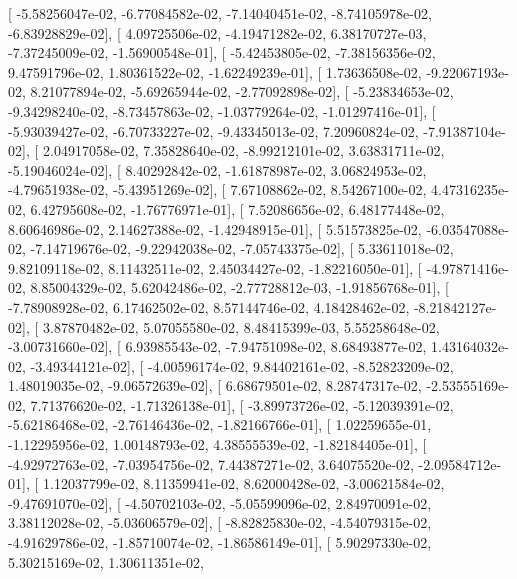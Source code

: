 \documentclass{article}
\begin{document}
       [ -5.58256047e-02,  -6.77084582e-02,  -7.14040451e-02,
         -8.74105978e-02,  -6.83928829e-02],
       [  4.09725506e-02,  -4.19471282e-02,   6.38170727e-03,
         -7.37245009e-02,  -1.56900548e-01],
       [ -5.42453805e-02,  -7.38156356e-02,   9.47591796e-02,
          1.80361522e-02,  -1.62249239e-01],
       [  1.73636508e-02,  -9.22067193e-02,   8.21077894e-02,
         -5.69265944e-02,  -2.77092898e-02],
       [ -5.23834653e-02,  -9.34298240e-02,  -8.73457863e-02,
         -1.03779264e-02,  -1.01297416e-01],
       [ -5.93039427e-02,  -6.70733227e-02,  -9.43345013e-02,
          7.20960824e-02,  -7.91387104e-02],
       [  2.04917058e-02,   7.35828640e-02,  -8.99212101e-02,
          3.63831711e-02,  -5.19046024e-02],
       [  8.40292842e-02,  -1.61878987e-02,   3.06824953e-02,
         -4.79651938e-02,  -5.43951269e-02],
       [  7.67108862e-02,   8.54267100e-02,   4.47316235e-02,
          6.42795608e-02,  -1.76776971e-01],
       [  7.52086656e-02,   6.48177448e-02,   8.60646986e-02,
          2.14627388e-02,  -1.42948915e-01],
       [  5.51573825e-02,  -6.03547088e-02,  -7.14719676e-02,
         -9.22942038e-02,  -7.05743375e-02],
       [  5.33611018e-02,   9.82109118e-02,   8.11432511e-02,
          2.45034427e-02,  -1.82216050e-01],
       [ -4.97871416e-02,   8.85004329e-02,   5.62042486e-02,
         -2.77728812e-03,  -1.91856768e-01],
       [ -7.78908928e-02,   6.17462502e-02,   8.57144746e-02,
          4.18428462e-02,  -8.21842127e-02],
       [  3.87870482e-02,   5.07055580e-02,   8.48415399e-03,
          5.55258648e-02,  -3.00731660e-02],
       [  6.93985543e-02,  -7.94751098e-02,   8.68493877e-02,
          1.43164032e-02,  -3.49344121e-02],
       [ -4.00596174e-02,   9.84402161e-02,  -8.52823209e-02,
          1.48019035e-02,  -9.06572639e-02],
       [  6.68679501e-02,   8.28747317e-02,  -2.53555169e-02,
          7.71376620e-02,  -1.71326138e-01],
       [ -3.89973726e-02,  -5.12039391e-02,  -5.62186468e-02,
         -2.76146436e-02,  -1.82166766e-01],
       [  1.02259655e-01,  -1.12295956e-02,   1.00148793e-02,
          4.38555539e-02,  -1.82184405e-01],
       [ -4.92972763e-02,  -7.03954756e-02,   7.44387271e-02,
          3.64075520e-02,  -2.09584712e-01],
       [  1.12037799e-02,   8.11359941e-02,   8.62000428e-02,
         -3.00621584e-02,  -9.47691070e-02],
       [ -4.50702103e-02,  -5.05599096e-02,   2.84970091e-02,
          3.38112028e-02,  -5.03606579e-02],
       [ -8.82825830e-02,  -4.54079315e-02,  -4.91629786e-02,
         -1.85710074e-02,  -1.86586149e-01],
       [  5.90297330e-02,   5.30215169e-02,   1.30611351e-02,
\end{document}
